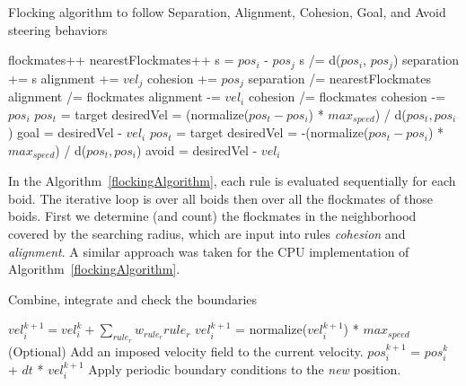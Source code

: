 \begin{algorithm}
\caption{Flocking algorithm to follow Separation, Alignment, Cohesion, Goal, and Avoid steering behaviors}
\label{flockingAlgorithm}
\begin{algorithmic}
	\STATE flockmates++
				\STATE nearestFlockmates++
				\STATE s = $pos_i$ - $pos_j$ 
				\STATE s /= d($pos_i$, $pos_j$) 
				\STATE separation += s
			\ENDIF
		\ENDIF
			\STATE alignment += $vel_j$
		\ENDIF
			\STATE cohesion += $pos_j$
		\ENDIF
	\ENDIF
\ENDFOR
{}
	\STATE separation /= nearestFlockmates
\ENDIF
{}
	\STATE alignment /=  flockmates
	\STATE alignment -= $vel_i$
\ENDIF
{}
	\STATE cohesion /=  flockmates
	\STATE cohesion -= $pos_i$
\ENDIF
{}
	\STATE $pos_t$ = target
	\STATE desiredVel = (normalize($pos_t - pos_i$) * $max_{speed}$) / d($pos_t, pos_i$) 
	\STATE goal = desiredVel - $vel_i$
\ENDIF
{}
	\STATE $pos_t$ = target
	\STATE desiredVel = -(normalize($pos_t - pos_i$) * $max_{speed}$) / d($pos_t, pos_i$) 
	\STATE avoid = desiredVel - $vel_i$
\ENDIF

\end{algorithmic}
\end{algorithm}

In the Algorithm~\ref{flockingAlgorithm}, each rule is evaluated sequentially for each boid. The iterative loop is over all boids then over all the flockmates of those boids. First we determine (and count) the flockmates in the neighborhood covered by the searching radius, which are input into rules \textit{cohesion} and \textit{alignment}. A similar approach was taken for the CPU implementation of Algorithm~\ref{flockingAlgorithm}.

\begin{algorithm}
\caption{Combine, integrate and check the boundaries}
\label{combineAlgorithm}
\begin{algorithmic}
\STATE $vel_i^{k+1} = vel_i^{k} + \sum_{rule_r} w_{rule_r} {rule_r} $
	\STATE $vel_i^{k+1}$ = normalize($vel_i^{k+1}$) * $max_{speed}$
\ENDIF  
\STATE (Optional) Add an imposed velocity field to the current velocity.
\STATE $pos_i^{k+1}$ = $pos_i^{k}$ + $dt$ * $vel_i^{k+1}$
\STATE Apply periodic boundary conditions to the \textit{new} position.
\end{algorithmic}
\end{algorithm}

